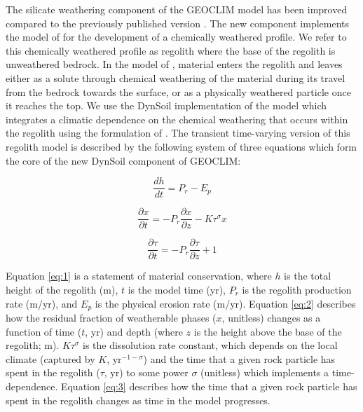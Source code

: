 \documentclass[11pt,letterpaper]{article}
\begin{document}
The silicate weathering component of the GEOCLIM model has been improved compared to the previously published version \citep{Godderis2017b}. The new component implements the model of \cite{Gabet2009a} for the development of a chemically weathered profile. We refer to this chemically weathered profile as regolith where the base of the regolith is unweathered bedrock. In the model of \citet{Gabet2009a}, material enters the regolith and leaves either as a solute through chemical weathering of the material during its travel from the bedrock towards the surface, or as a physically weathered particle once it reaches the top. We use the DynSoil implementation of the \cite{Gabet2009a} model which integrates a climatic dependence on the chemical weathering that occurs within the regolith using the formulation of \cite{West2012a}. The transient time-varying version of this regolith model is described by the following system of three equations which form the core of the new DynSoil component of GEOCLIM:

\begin{equation}
    \frac{dh}{dt} = P_{r} - E_{p}
    \label{eq:1}
\end{equation}

\begin{equation}
    \frac{\partial x}{\partial t} = -P_{r} \frac{\partial x}{\partial z} - K \tau^{\sigma}x
    \label{eq:2}
\end{equation}

\begin{equation}
    \frac{\partial \tau}{\partial t} = -P_{r} \frac{\partial \tau}{\partial z} + 1
    \label{eq:3}
\end{equation}

\noindent
Equation \ref{eq:1} is a statement of material conservation, where $h$ is the total height of the regolith (m), $t$ is the model time (yr), $P_{r}$ is the regolith production rate (m/yr), and $E_{p}$ is the physical erosion rate (m/yr). Equation \ref{eq:2} describes how the residual fraction of weatherable phases ($x$, unitless) changes as a function of time ($t$, yr) and depth (where $z$ is the height above the base of the regolith; m). $K \tau^{\sigma}$ is the dissolution rate constant, which depends on the local climate (captured by $K$, yr$^{-1-\sigma}$) and the time that a given rock particle has spent in the regolith ($\tau$, yr) to some power $\sigma$ (unitless) which implements a time-dependence. Equation \ref{eq:3} describes how the time that a given rock particle has spent in the regolith changes as time in the model progresses.
\end{document}
